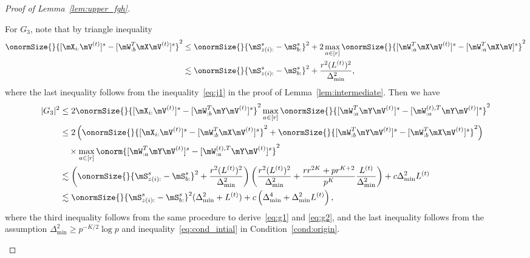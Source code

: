 \documentclass[lettersize,onecolumn,journal]{IEEEtran}
\theoremstyle{definition}
\theoremstyle{definition}
\newcommand{\of}[1]{\left(#1\right)}
\begin{document}
\begin{proof}[Proof of Lemma~\ref{lem:upper_fgh}]
\begin{enumerate}[wide]
    For $G_3$, note that by triangle inequality
    \begin{align}
        \onormSize{}{[\mX_{i:} \mV^{(t)}]^s  -  [  \mW_{:b}^T \mX \mV^{(t)} ]^s}^2 &\leq \onormSize{}{\mS_{z(i):}^s - \mS_{b:}^s}^2 + 2\max_{a \in [r]}\onormSize{}{[\mW_{:a}^T\mX \mV^{(t)}]^s - [\mW_{:a}^T\mX \mV]^s }^2\\
        & \lesssim \onormSize{}{\mS_{z(i):}^s - \mS_{b:}^s}^2 + \frac{r^2 (L^{(t)})^2}{\Delta_{\min}^2}, \label{eq:g3xv_wxv}
    \end{align}
    where the last inequality follows from the inequality~\eqref{eq:j1} in the proof of Lemma~\ref{lem:intermediate}.
   Then we have 
    \begin{align}
        |G_3|^2 & \leq 2 \onormSize{}{[\mX_{i:} \mV^{(t)}]^s  -  [  \mW_{:b}^T \mY \mV^{(t)} ]^s}^2 \max_{a \in [r]} \onormSize{}{ [  \mW_{:a}^T \mY \mV^{(t)} ]^s -  [   \mW_{:a}^{(t),T} \mY \mV^{(t)}  ]^s}^2 \\
        & \leq 2 \of{ \onormSize{}{[\mX_{i:} \mV^{(t)}]^s  -  [  \mW_{:b}^T \mX \mV^{(t)} ]^s}^2  +  \onormSize{}{ [  \mW_{:b}^T \mY \mV^{(t)} ]^s  -  [  \mW_{:b}^T \mX \mV^{(t)} ]^s}^2  } \\
        & \quad \times \max_{a \in [r]} \onorm{ [  \mW_{:a}^T \mY \mV^{(t)} ]^s -  [   \mW_{:a}^{(t),T} \mY \mV^{(t)}  ]^s}^2\\
        & \lesssim \of{\onormSize{}{\mS_{z(i):}^s - \mS_{b:}^s}^2 + \frac{r^2 (L^{(t)})^2}{\Delta_{\min}^2} } \of{ \frac{r^2(L^{(t)})^2}{ \Delta_{\min}^2} + \frac{r r^{2K} + pr^{K+2}}{p^{K}} \frac{L^{(t)}}{\Delta_{\min}^2}}+ c \Delta_{\min}^2 L^{(t)} \\
        & \lesssim \onormSize{}{\mS_{z(i):}^s - \mS_{b:}^s}^2 (\Delta_{\min}^2 + L^{(t)}) + c\of{\Delta_{\min}^4 +  \Delta_{\min}^2 L^{(t)}},\label{eq:g3}
    \end{align}
    where the third inequality follows from the same procedure to derive~\eqref{eq:g1} and \eqref{eq:g2}, and the last inequality follows from the assumption $\Delta_{\min}^2 \geq p^{-K/2} \log p$ and inequality~\eqref{eq:cond_intial} in Condition~\ref{cond:origin}.
    

\end{enumerate}
\end{proof}
\end{document}
